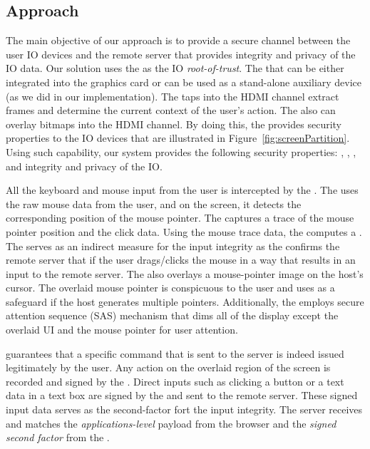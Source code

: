 \iffalse
\subsection{Approach}

The main objective of our approach is to provide a secure channel between the user IO devices and the remote server that provides integrity and privacy of the IO data. Our solution uses the \device as the IO \emph{root-of-trust}. The \device that can be either integrated into the graphics card or can be used as a stand-alone auxiliary device (as we did in our implementation). The \device taps into the HDMI channel extract frames and determine the current context of the user's action. The \device also can overlay bitmaps into the HDMI channel. By doing this, the \device provides security properties to the IO devices that are illustrated in Figure~\ref{fig:screenPartition}. Using such capability, our system provides the following security properties: \emph{\pop}, \emph{\poui}, \emph{\poa}, and integrity and privacy of the IO.

\myparagraph{\Pop} All the keyboard and mouse input from the user is intercepted by the \device. The \device uses the raw mouse data from the user, and on the screen, it detects the corresponding position of the mouse pointer. The \device captures a trace of the mouse pointer position and the click data. Using the mouse trace data, the \device computes a \emph{\pop}. The \pop serves as an indirect measure for the input integrity as the \device confirms the remote server that if the user drags/clicks the mouse in a way that results in an input to the remote server. The \device also overlays a mouse-pointer image on the host's cursor. The overlaid mouse pointer is conspicuous to the user and uses as a safeguard if the host generates multiple pointers. Additionally, the \device employs secure attention sequence (SAS) mechanism that dims all of the display except the overlaid UI and the mouse pointer for user attention.

\myparagraph{\poa} \Poa guarantees that a specific command that is sent to the server is indeed issued legitimately by the user. Any action on the overlaid region of the screen is recorded and signed by the \device.  Direct inputs such as clicking a button or a text data in a text box are signed by the \device and sent to the remote server. These signed input data serves as the second-factor fort the input integrity. The server receives and matches the \emph{applications-level} payload from the browser and the \emph{signed second factor} from the \device. 

